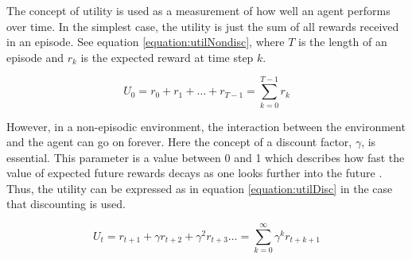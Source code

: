 The concept of utility is used as a measurement of how well an agent performs
over time. In the simplest case, the utility is just the sum of all rewards
received in an episode. See equation \eqref{equation:utilNondisc}, where $T$ is the
length of an episode and $r_k$ is the expected reward at time step $k$.

\begin{equation}
\label{equation:utilNondisc}
U_0 = r_{0} + r_{1} + \dots + r_{T-1}
  = \sum\limits_{k = 0}^{T-1} r_{k}
\end{equation}

However, in a non-episodic environment, the interaction between the environment and the agent can go on forever.
Here the concept of a discount factor, $\gamma$, is essential. This parameter
is a value between 0 and 1 which describes how fast the value of expected
future rewards decays as one looks further into the future
\parencite{barto1998reinforcement}. Thus, the utility can be expressed as in
equation \eqref{equation:utilDisc} in the case that discounting is used. 

\begin{equation}
\label{equation:utilDisc}
U_{t} = r_{t + 1} + \gamma r_{t + 2} + \gamma^2 r_{t + 3} \dots
  =  \sum\limits_{k = 0}^\infty \gamma^kr_{t+k+1}
\end{equation}




%

